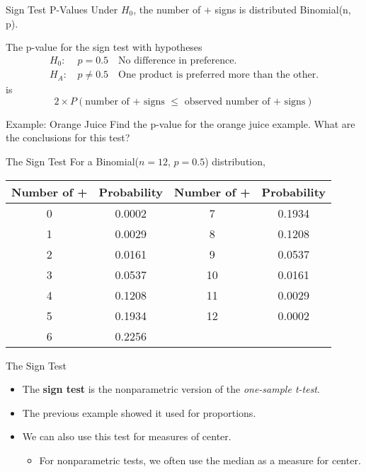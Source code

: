 \begin{frame}{Sign Test P-Values}
    Under $H_0$, the number of $+$ signs is distributed Binomial(n, p).

    \vspace{12pt}The p-value for the sign test with hypotheses
    \begin{align*}
        H_0\text{: }& p=0.5 \quad \text{No difference in preference.} \\
        H_A\text{: }& p\ne0.5 \quad \text{One product is preferred more than the other.} 
    \end{align*}
    is 
    \[
        2 \times P(\text{number of + signs } \le \text{ observed number of + signs})
    \]
\end{frame}

\begin{frame}{Example: Orange Juice}
    Find the p-value for the orange juice example. What are the conclusions for this test?
\end{frame}

\begin{frame}{The Sign Test}
    For a Binomial($n=12$, $p=0.5$) distribution,
    \begin{table}[h]
        \centering
        \begin{tabular}{cc | cc}
            \hline
            Number of + & Probability & Number of + & Probability \\
            \hline
            0 & 0.0002 & 7 & 0.1934 \\
            1 & 0.0029 & 8 & 0.1208 \\
            2 & 0.0161 & 9 & 0.0537 \\
            3 & 0.0537 & 10 & 0.0161 \\
            4 & 0.1208 & 11 & 0.0029 \\
            5 & 0.1934 & 12 & 0.0002 \\ 
            6 & 0.2256 & & \\
            \hline 
        \end{tabular}
    \end{table}
\end{frame}

\begin{frame}{The Sign Test}
    \begin{itemize}
        \item The \textbf{sign test} is the nonparametric version of the \textit{one-sample t-test}.
        \item The previous example showed it used for proportions.
        \item We can also use this test for measures of center.
        \begin{itemize}
            \item For nonparametric tests, we often use the median as a measure for center. 
        \end{itemize}
    \end{itemize}
\end{frame}


